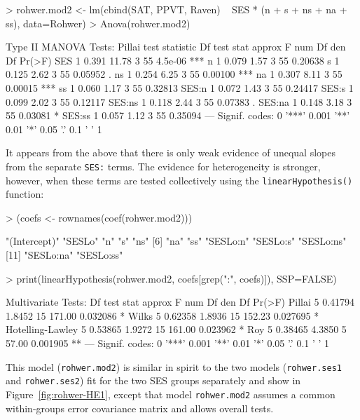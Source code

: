 \documentclass[11pt]{article}
\newcommand{\figref}[1]{Figure~\ref{#1}}
\newcommand{\code}[1]{{\texttt{#1}}}
\newcommand{\func}[1]{{\texttt{#1()}}}
\begin{document}
\begin{Schunk}
\begin{Sinput}
> rohwer.mod2 <- lm(cbind(SAT, PPVT, Raven) ~ SES * (n + s + ns + na + ss),
                    data=Rohwer)
> Anova(rohwer.mod2)
\end{Sinput}
\begin{Soutput}
Type II MANOVA Tests: Pillai test statistic
       Df test stat approx F num Df den Df  Pr(>F)    
SES     1     0.391    11.78      3     55 4.5e-06 ***
n       1     0.079     1.57      3     55 0.20638    
s       1     0.125     2.62      3     55 0.05952 .  
ns      1     0.254     6.25      3     55 0.00100 ***
na      1     0.307     8.11      3     55 0.00015 ***
ss      1     0.060     1.17      3     55 0.32813    
SES:n   1     0.072     1.43      3     55 0.24417    
SES:s   1     0.099     2.02      3     55 0.12117    
SES:ns  1     0.118     2.44      3     55 0.07383 .  
SES:na  1     0.148     3.18      3     55 0.03081 *  
SES:ss  1     0.057     1.12      3     55 0.35094    
---
Signif. codes:  0 '***' 0.001 '**' 0.01 '*' 0.05 '.' 0.1 ' ' 1 
\end{Soutput}
\end{Schunk}
It appears from the above that there is only weak evidence of unequal slopes
from the separate \code{SES:} terms. The evidence for heterogeneity is
stronger, however, when these terms are tested collectively using the 
\func{linearHypothesis} function:

\begin{Schunk}
\begin{Sinput}
> (coefs <- rownames(coef(rohwer.mod2)))
\end{Sinput}
\begin{Soutput}
 [1] "(Intercept)" "SESLo"       "n"           "s"           "ns"         
 [6] "na"          "ss"          "SESLo:n"     "SESLo:s"     "SESLo:ns"   
[11] "SESLo:na"    "SESLo:ss"   
\end{Soutput}
\begin{Sinput}
> print(linearHypothesis(rohwer.mod2, coefs[grep(":", coefs)]), SSP=FALSE)
\end{Sinput}
\begin{Soutput}
Multivariate Tests: 
                 Df test stat approx F num Df den Df   Pr(>F)   
Pillai            5   0.41794   1.8452     15 171.00 0.032086 * 
Wilks             5   0.62358   1.8936     15 152.23 0.027695 * 
Hotelling-Lawley  5   0.53865   1.9272     15 161.00 0.023962 * 
Roy               5   0.38465   4.3850      5  57.00 0.001905 **
---
Signif. codes:  0 '***' 0.001 '**' 0.01 '*' 0.05 '.' 0.1 ' ' 1 
\end{Soutput}
\end{Schunk}
This model (\code{rohwer.mod2}) is similar in spirit to the two models
(\code{rohwer.ses1} and \code{rohwer.ses2})
fit for the two SES groups separately and show in \figref{fig:rohwer-HE1},
except that model \code{rohwer.mod2} assumes a common within-groups error covariance matrix
and allows overall tests.
\end{document}
